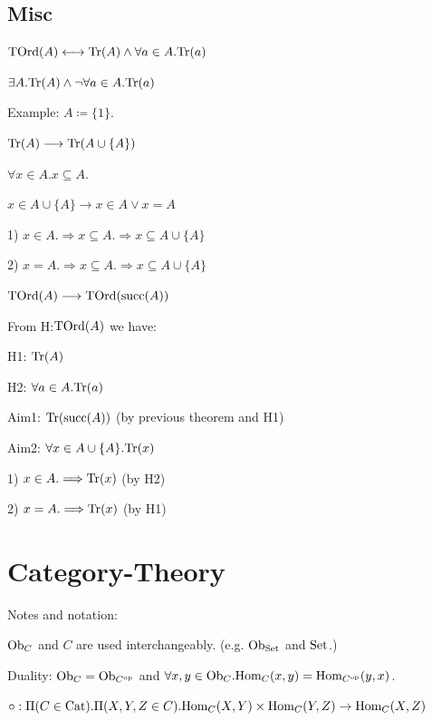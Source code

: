 \documentclass[10pt,a4paper]{article}
\begin{document}
\subsection{Misc}
\begin{definition}
${\textrm{TOrd}}(A) \longleftrightarrow {\textrm{Tr}}(A)\land \forall a\in A. {\textrm{Tr}}(a)$
\end{definition}
\begin{theorem}
$\exists A. {\textrm{Tr}}(A) \land \neg \forall a\in A. {\textrm{Tr}}(a)$

Example: $A\coloneqq \{1\}$.
\end{theorem}
\begin{theorem}
${\textrm{Tr}}(A) \longrightarrow {\textrm{Tr}}(A\cup\{A\})$

\myprf

$\forall x\in A.x\subseteq A.$

$x\in A\cup\{A\} \longrightarrow x\in A \lor x=A$

1) $x\in A. \Longrightarrow x\subseteq A. \Longrightarrow x\subseteq A\cup\{A\}$

2) $x = A. \Longrightarrow x\subseteq A. \Longrightarrow x\subseteq A\cup\{A\}$

\myqed
\end{theorem}
\begin{theorem}
  $ {\textrm{TOrd}}(A) \longrightarrow {\textrm{TOrd}}({\textrm{succ}}(A))$

\myprf

From H:${\textrm{TOrd}}(A)$ we have:

H1: ${\textrm{Tr}}(A)$

H2: $\forall a\in A. {\textrm{Tr}}(a)$

Aim1: ${\textrm{Tr}}({\textrm{succ}}(A))$ (by previous theorem and H1)

Aim2: $\forall x\in A\cup\{A\}. {\textrm{Tr}}(x)$

1) $x\in A. \Longrightarrow {\textrm{Tr}}(x)$ (by H2)

2) $x = A. \Longrightarrow {\textrm{Tr}}(x)$ (by H1) %

\myqed
\end{theorem}
\section{Category-Theory}
Notes and notation:

${\textrm{Ob}}_C$ and $C$ are used interchangeably. (e.g. ${\textrm{Ob}}_{\textrm{Set}}$ and ${\textrm{Set}}$.)

Duality: ${\textrm{Ob}}_C = {\textrm{Ob}}_{C^{\textrm{op}}}$ and 
 $\forall x,y \in {\textrm{Ob}}_C. {\textrm{Hom}}_C(x,y) = {\textrm{Hom}}_{C^{\textrm{op}}}(y,x)$.

$\circ : \Pi(C\in {\textrm{Cat}}).\Pi(X,Y,Z\in C).{\textrm{Hom}}_C(X,Y)\times{\textrm{Hom}}_C(Y,Z)\to{\textrm{Hom}}_C(X,Z)$
\end{document}
